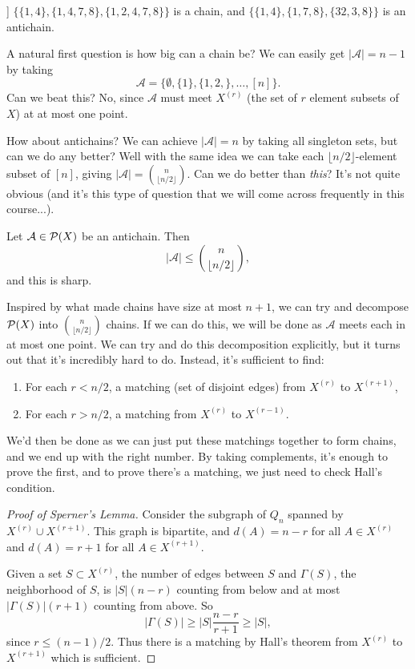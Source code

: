 \documentclass[a4paper]{scrartcl}
\newcommand{\A}{\mathcal{A}}
\begin{document}
\begin{example}]
    $\{\{1, 4\}, \{1, 4, 7, 8\}, \{1, 2, 4, 7, 8\}\}$ is a chain, and  $\{\{1, 4\}, \{1, 7, 8\}, \{32, 3, 8\}\}$ is an antichain.
\end{example}

A natural first question is how big can a chain be? We can easily get $|\A| = n - 1$ by taking
$$
\A = \{\emptyset, \{1\}, \{1, 2, \}, \dots, [n]\}.
$$
Can we beat this? No, since $\A$ must meet $X^{(r)}$ (the set of $r$ element subsets of $X$) at at most one point.

How about antichains? We can achieve $|\A| = n$ by taking all singleton sets, but can we do any better? Well with the same idea we can take each $\lfloor n/2\rfloor$-element subset of $[n]$, giving $|\A| = \binom{n}{\lfloor n/2\rfloor}$. Can we do better than \emph{this}? It's not quite obvious (and it's this type of question that we will come across frequently in this course...).

\begin{theorem}\label{sperner}
    Let $\A \in \power(X)$ be an antichain. Then
    $$
    |\A| \leq \binom{n}{\lfloor n/2 \rfloor},
    $$
    and this is sharp.
\end{theorem}

Inspired by what made chains have size at most $n + 1$, we can try and decompose $\mathcal{P} (X)$ into $\binom{n}{\lfloor n/2 \rfloor}$ chains. If we can do this, we will be done as $\A$ meets each in at most one point.
We can try and do this decomposition explicitly, but it turns out that it's incredibly hard to do. 
Instead, it's sufficient to find:

\begin{enumerate}
    \item For each $r < n/2$, a matching (set of disjoint edges) from $X^{(r)}$ to $X^{(r + 1)}$,
    \item For each $r > n/2$, a matching from $X^{(r)}$ to $X^{(r - 1)}$.
\end{enumerate}
We'd then be done as we can just put these matchings together to form chains, and we end up with the right number. By taking complements, it's enough to prove the first, and to prove there's a matching, we just need to check Hall's condition.

\begin{proof}[Proof of Sperner's Lemma]
    Consider the subgraph of $Q_n$ spanned by $X^{(r)}\cup X^{(r + 1)}$. This graph is bipartite, and $d(A) = n - r$ for all $A \in X^{(r)}$ and $d(A) = r + 1$ for all $A \in X^{(r + 1)}$.

    Given a set $S \subset X^{(r)}$, the number of edges between $S$ and $\Gamma(S)$, the neighborhood of $S$, is
    $|S|(n - r)$ counting from below and at most $|\Gamma(S)|(r + 1)$ counting from above. So
    $$
    |\Gamma(S)| \geq |S| \frac{n - r}{r + 1} \geq |S|,
    $$
    since $r \leq (n - 1)/2$. Thus there is a matching by Hall's theorem from $X^{(r)}$ to $X^{(r + 1)}$ which is sufficient.
\end{proof}
\end{document}
